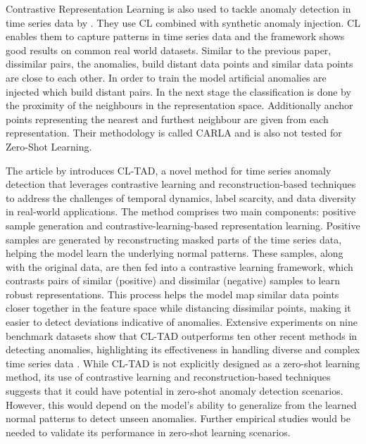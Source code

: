 Contrastive Representation Learning is also used to tackle anomaly detection in time series data by . They use CL combined with synthetic anomaly injection. CL enables them to capture patterns in time series data and the framework shows good results on common real world datasets. Similar to the previous paper, dissimilar pairs, the anomalies, build distant data points and similar data points are close to each other. In order to train the model artificial anomalies are injected which build distant pairs. In the next stage the classification is done by  the proximity of the neighbours in the representation space. Additionally anchor points representing the nearest and furthest neighbour are given from each representation. Their methodology is called CARLA and is also not tested for Zero-Shot Learning.%

The article by  introduces CL-TAD, a novel method for time series anomaly detection that leverages contrastive learning and reconstruction-based techniques to address the challenges of temporal dynamics, label scarcity, and data diversity in real-world applications. The method comprises two main components: positive sample generation and contrastive-learning-based representation learning. Positive samples are generated by reconstructing masked parts of the time series data, helping the model learn the underlying normal patterns. These samples, along with the original data, are then fed into a contrastive learning framework, which contrasts pairs of similar (positive) and dissimilar (negative) samples to learn robust representations. This process helps the model map similar data points closer together in the feature space while distancing dissimilar points, making it easier to detect deviations indicative of anomalies. Extensive experiments on nine benchmark datasets show that CL-TAD outperforms ten other recent methods in detecting anomalies, highlighting its effectiveness in handling diverse and complex time series data \cite{ngu_cl-tad_2023}.
While CL-TAD is not explicitly designed as a zero-shot learning method, its use of contrastive learning and reconstruction-based techniques suggests that it could have potential in zero-shot anomaly detection scenarios. However, this would depend on the model's ability to generalize from the learned normal patterns to detect unseen anomalies. Further empirical studies would be needed to validate its performance in zero-shot learning scenarios.

